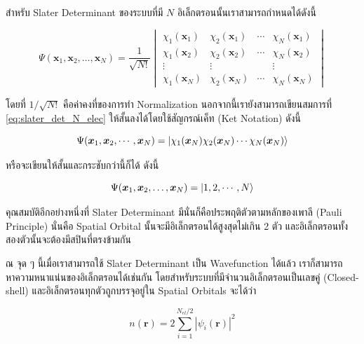 สำหรับ Slater Determinant ของระบบที่มี $N$ อิเล็กตรอนนั้นเราสามารถกำหนดได้ดังนี้\autocite{szabo1996}

\begin{equation}\label{eq:slater_det_N_elec}
    \Psi(\bm{x}_{1}, \bm{x}_{2}, \dots, \bm{x}_{N}) = 
    \frac{1}{\sqrt{N!}}
    \begin{vmatrix}
        \chi_{1}(\bm{x}_{1}) & \chi_{2}(\bm{x}_{1}) & \cdots & \chi_{N}(\bm{x}_{1}) \\
        \chi_{1}(\bm{x}_{2}) & \chi_{2}(\bm{x}_{2}) & \cdots & \chi_{N}(\bm{x}_{2}) \\
        \vdots & \vdots & & \vdots \\
        \chi_{1}(\bm{x}_{N}) & \chi_{2}(\bm{x}_{N}) & \cdots & \chi_{N}(\bm{x}_{N})
    \end{vmatrix}
\end{equation}

\noindent โดยที่ $1/\sqrt{N!}$ คือค่าคงที่ของการทำ Normalization นอกจากนี้เรายังสามารถเขียนสมการที่ \ref{eq:slater_det_N_elec} 
ให้สั้นลงได้โดยใช้สัญกรณ์เค็ท (Ket Notation) ดังนี้

\begin{equation}\label{eq:slater_det_ket}
    \Psi(\bm{x}_{1}, \bm{x}_{2}, \cdots, \bm{x}_{N}) = 
    \ket{\chi_{1}(\bm{x}_{N}) \chi_{2}(\bm{x}_{N}) \cdots \chi_{N}(\bm{x}_{N})}
\end{equation}

\noindent หรือจะเขียนให้สั้นและกระชับกว่านี้ก็ได้ ดังนี้

\begin{equation}\label{eq:slater_det_ket_short}
    \Psi(\bm{x}_{1}, \bm{x}_{2}, \dots, \bm{x}_{N}) = 
    \ket{1, 2, \cdots, N}
\end{equation}

คุณสมบัติอีกอย่างหนึ่งที่ Slater Determinant มีนั่นก็คือประพฤติตัวตามหลักของเพาลี (Pauli Principle) นั่นคือ Spatial Orbital 
นั้นจะมีอิเล็กตรอนได้สูงสุดไม่เกิน 2 ตัว และอิเล็กตรอนทั้งสองตัวนั้นจะต้องมีสปินที่ตรงข้ามกัน\autocite{atkins2010}

ณ จุด ๆ นี้เมื่อเราสามารถใช้ Slater Determinant เป็น Wavefunction ได้แล้ว เราก็สามารถหาความหนาแน่นของอิเล็กตรอนได้เช่นกัน
โดยสำหรับระบบที่มีจำนวนอิเล็กตรอนเป็นเลขคู่ (Closed-shell) และอิเล็กตรอนทุกตัวถูกบรรจุอยู่ใน Spatial Orbitals จะได้ว่า

\begin{equation}\label{eq:density_slater}
    n(\bm{r}) = 2 \sum_{i=1}^{N_{el}/2} |\psi_{i}(\bm{r})|^{2}
\end{equation}

